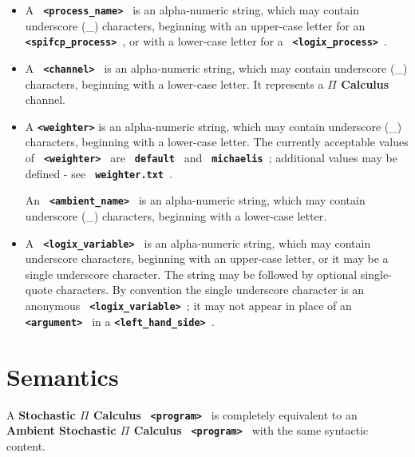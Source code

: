\documentclass[twoside,10pt]{report}
\begin{document}
\begin{itemize}
\item
A {\bf \verb+ <process_name> +} is an alpha-numeric string,
which may contain underscore (\_) characters, beginning with an
upper-case letter for an {\bf \verb+ <spifcp_process> +}, or with a
lower-case letter for a {\bf \verb+ <logix_process> +}.

\item
A {\bf \verb+ <channel> +} is an alpha-numeric string,
which may contain underscore (\_) characters, beginning with a lower-case
letter.  It represents a {\bf $\Pi$ Calculus} channel.

\item
A {\bf \verb+<weighter>+} is an alpha-numeric string,
which may contain underscore (\_) characters, beginning with a lower-case
letter.  The currently acceptable values of {\bf \verb+ <weighter> +} are
{\bf \verb+ default +} and {\bf \verb+ michaelis +}; additional values may be
defined - see {\bf \verb+ weighter.txt +}.

An {\bf \verb+ <ambient_name> +} is an alpha-numeric string,
which may contain underscore (\_) characters, beginning with
a lower-case letter.

\item
A {\bf \verb+ <logix_variable> +} is an alpha-numeric string,
which may contain underscore characters, beginning with an upper-case letter,
or it may be a single underscore character.  The string may be followed by
optional single-quote characters.  By convention the single underscore
character is an anonymous {\bf \verb+ <logix_variable> +}; it may not appear
in place of an {\bf \verb+ <argument> +} in a {\bf \verb+<left_hand_side> +}.

\end{itemize}

\section{Semantics}

A {\bf Stochastic $\Pi$ Calculus} {\bf \verb+ <program> +} is completely
equivalent to an {\bf Ambient Stochastic $\Pi$ Calculus}
{\bf \verb+ <program> +} with the same syntactic content.
 
\end{document}
